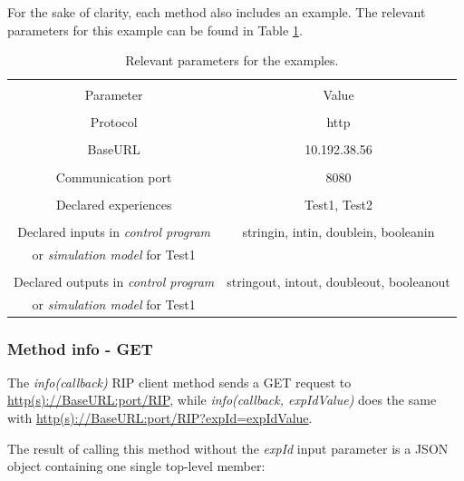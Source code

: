 For the sake of clarity, each method also includes an example. The relevant parameters for this example can be found in Table \ref{tab:low-level-example}.

\begin{table}[]
    \centering
    \begin{tabular}{|c|c|}
        \hline
         & \\Parameter & Value \\
         \hline
         & \\Protocol & http \\
         \hline
         & \\BaseURL & 10.192.38.56 \\
        \hline
        & \\Communication port & 8080 \\
        \hline
         & \\Declared experiences & Test1, Test2 \\
        \hline
         & \\Declared inputs in \textit{control program} & stringin, intin, doublein, booleanin
         \\or \textit{simulation model} for Test1 & \\
        \hline
        & \\Declared outputs in \textit{control program} & stringout, intout, doubleout, booleanout
          \\or \textit{simulation model} for Test1 & \\
        \hline
    \end{tabular}
    \caption{Relevant parameters for the examples.}
    \label{tab:low-level-example}
\end{table}

\subsubsection{Method info - GET}
\label{sec:info}
The \textit{info(callback)} RIP client method sends a GET request to \url{http(s)://BaseURL:port/RIP}, while \textit{info(callback, expIdValue)} does the same with \url{http(s)://BaseURL:port/RIP?expId=expIdValue}.

The result of calling this method without the \textit{expId} input parameter is a JSON object containing one single top-level member:

